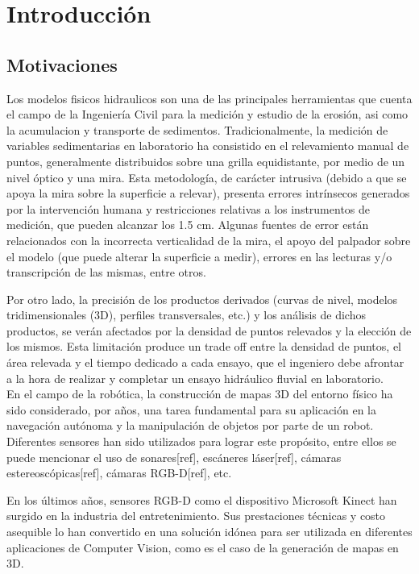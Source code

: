 \chapter{Introducción}

\section{Motivaciones}
\label{S:motivaciones}

Los modelos fisicos hidraulicos son una de las principales herramientas que cuenta el campo de la Ingeniería Civil para la medición y estudio de la erosión, asi como la acumulacion y transporte de sedimentos.
Tradicionalmente, la medición de variables sedimentarias en laboratorio ha consistido en el relevamiento manual de puntos, generalmente distribuidos sobre una grilla equidistante, por medio de un nivel óptico y una mira.
Esta metodología, de carácter intrusiva (debido a que se apoya la mira sobre la superficie a relevar), presenta errores intrínsecos generados por la intervención humana y restricciones relativas a los instrumentos de medición, que pueden alcanzar los 1.5 cm. Algunas fuentes de error están relacionados con la incorrecta verticalidad de la mira, el apoyo del palpador sobre el modelo (que puede alterar la superficie a medir), errores en las lecturas y/o transcripción de las mismas, entre otros.

Por otro lado, la precisión de los productos derivados (curvas de nivel, modelos tridimensionales (3D), perfiles transversales, etc.) y los análisis de dichos productos, se verán afectados por la densidad de puntos relevados y la elección de los mismos.
Esta limitación produce un trade off entre la densidad de puntos, el área relevada y el tiempo dedicado a cada ensayo, que el ingeniero debe afrontar a la hora de realizar y completar un ensayo hidráulico fluvial en laboratorio. \\


En el campo de la robótica, la construcción de mapas 3D del entorno físico ha sido considerado, por años, una tarea fundamental para su aplicación en la navegación autónoma y la manipulación de objetos por parte de un robot. Diferentes sensores han sido utilizados para lograr este propósito, entre ellos se puede mencionar el uso de sonares[ref], escáneres láser[ref], cámaras estereoscópicas[ref], cámaras RGB-D[ref], etc.

En los últimos años, sensores RGB-D como el dispositivo Microsoft Kinect han surgido en la industria del entretenimiento. Sus prestaciones técnicas y costo asequible lo han convertido en una solución idónea para ser utilizada en diferentes aplicaciones de Computer Vision, como es el caso de la generación de mapas en 3D. \\

